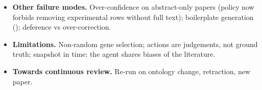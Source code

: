 \begin{itemize}[nosep]
\nAuditRowsFlagged{} rows on \nAuditGenesFlagged{} genes; manual triage found no intact-site error. Four were
statements about engineered mutations or a negation, and in the two genuine cases (, )
the claim held: both kinases keep the catalytic-loop aspartate that UniProt annotates but have lost the
Mg$^{2+}$-binding aspartate of the DFG motif (Ser485 and Asn453;
\texttt{paper/release/residue\_audit\_triage.yaml}), the residues of kinase subdomain VII that the original
 paper reports missing. The flag fired on a different residue from the one the prose meant, which
is the ambiguity a structured claim removes; both arguments are now recorded as structured claims, backed by
archived pairwise alignments to the active kinase CERK1, that pass every check including the new alignment
check.
        Structured claims cover only \nResGenes{} genes so far; most residue arguments remain in prose
        and are not machine-checked.
  \item \textbf{Other failure modes.} Over-confidence on abstract-only papers (policy now
        forbids removing experimental rows without full text); boilerplate generation
        (); deference vs over-correction.
  \item \textbf{Limitations.} Non-random gene selection; actions are judgements, not ground
        truth; snapshot in time; the agent shares biases of the literature.
  \item \textbf{Towards continuous review.} Re-run on ontology change, retraction, new paper.
\end{itemize}
